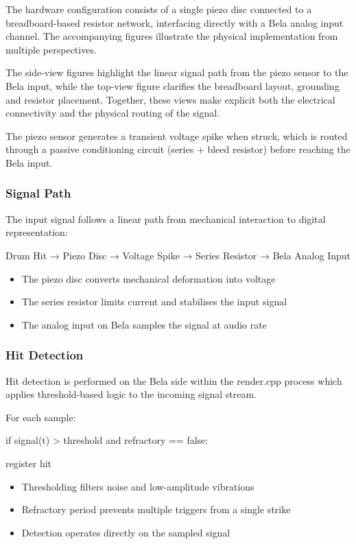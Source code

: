 The hardware configuration consists of a single piezo disc connected to
a breadboard-based resistor network, interfacing directly with a Bela
analog input channel. The accompanying figures illustrate the physical
implementation from multiple perspectives.

The side-view figures highlight the linear signal path from the piezo
sensor to the Bela input, while the top-view figure clarifies the
breadboard layout, grounding and resistor placement. Together, these
views make explicit both the electrical connectivity and the physical
routing of the signal.

The piezo sensor generates a transient voltage spike when struck, which
is routed through a passive conditioning circuit (series + bleed
resistor) before reaching the Bela input.

\subsubsection{Signal Path}\label{signal-path}

The input signal follows a linear path from mechanical interaction to
digital representation:

Drum Hit → Piezo Disc → Voltage Spike → Series Resistor → Bela Analog
Input

\begin{itemize}
\item
  The piezo disc converts mechanical deformation into voltage
\item
  The series resistor limits current and stabilises the input signal
\item
  The analog input on Bela samples the signal at audio rate
\end{itemize}

\subsubsection{Hit Detection}\label{hit-detection}

Hit detection is performed on the Bela side within the render.cpp
process which applies threshold-based logic to the incoming signal
stream.

For each sample:

if signal(t) \textgreater{} threshold and refractory == false:

register hit

\begin{itemize}
\item
  Thresholding filters noise and low-amplitude vibrations
\item
  Refractory period prevents multiple triggers from a single strike
\item
  Detection operates directly on the sampled signal
\end{itemize}

